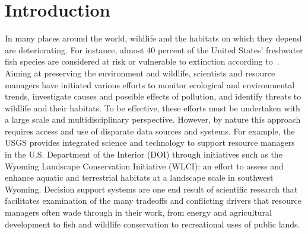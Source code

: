 \documentclass[letterpaper]{report}
\begin{document}
\tableofcontents

\cleardoublepage
{}
\listoffigures

\cleardoublepage
{}
\listoftables

\chapter{Introduction}
\label{introduction}
In many places around the world, wildlife and the habitats on which they depend are deteriorating. For instance, almost 40 percent of the United States' freshwater fish species are considered at risk or vulnerable to extinction according to~\cite{fish}. Aiming at preserving the environment and wildlife, scientists and resource managers have initiated various efforts to monitor ecological and environmental trends, investigate causes and possible effects of pollution, and identify threats to wildlife and their habitats. To be effective, these efforts must be undertaken with a large scale and multidisciplinary perspective.  However, by nature this approach requires access and use of disparate data sources and systems. For example, the USGS provides integrated science and technology to support resource managers in the U.S. Department of the Interior (DOI) through initiatives such as the Wyoming Landscape Conservation Initiative (WLCI): an effort to assess and enhance aquatic and terrestrial habitats at a landscape scale in southwest Wyoming. Decision support systems are one end result of scientific research that facilitates examination of the many tradeoffs and conflicting drivers that resource managers often wade through in their work, from energy and agricultural development to fish and wildlife conservation to recreational uses of public lands. 
\end{document}
